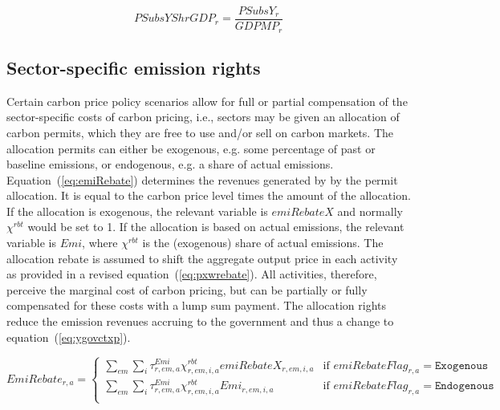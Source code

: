 \documentclass[11pt,letterpaper]{report}
\begin{document}
\begin{equation}
\label{eq:pSubsYShrGDP}
\mathit{PSubsYShrGDP}_r = \frac{\mathit{PSubsY}_r}{\mathit{GDPMP}_r}
\end{equation}

\subsection{Sector-specific emission rights}

Certain carbon price policy scenarios allow for full or partial
compensation of the sector-specific costs of carbon pricing, i.e.,
sectors may be given an allocation of carbon permits, which
they are free to use and/or sell on carbon markets. The allocation
permits can either be exogenous, e.g. some percentage of past
or baseline emissions, or endogenous, e.g. a share of actual
emissions. Equation~(\ref{eq:emiRebate}) determines the revenues generated by
by the permit allocation. It is equal to the carbon price level
times the amount of the allocation. If the allocation
is exogenous, the relevant variable is $\mathit{emiRebateX}$ and normally
$\chi^{\mathit{rbt}}$ would be set to 1. If the allocation is based on
actual emissions, the relevant variable is $\mathit{Emi}$, where
$\chi^{\mathit{rbt}}$ is the (exogenous) share of actual emissions.
The allocation rebate is assumed to shift the aggregate output price
in each activity as provided in a revised equation~(\ref{eq:pxwrebate}).
All activities, therefore, perceive the marginal cost of carbon
pricing, but can be partially or fully compensated for these costs
with a lump sum payment. The allocation rights reduce the emission revenues
accruing to the government and thus a change to equation~(\ref{eq:ygovctxp}).

\begin{equation}
\label{eq:emiRebate}
\mathit{EmiRebate}_{r,a} =
\begin{cases} \displaystyle
\sum_{\mathit{em}}{\sum_i{\tau^{\mathit{Emi}}_{r,\mathit{em},\mathit{a}}  \chi^{\mathit{rbt}}_{r,\mathit{em},i,a} \mathit{emiRebateX}_{r,\mathit{em},i,a}}} & \textrm{if } \mathit{emiRebateFlag}_{r,a} = \texttt{Exogenous} \\
\displaystyle
\sum_{\mathit{em}}{\sum_i{\tau^{\mathit{Emi}}_{r,\mathit{em},\mathit{a}}  \chi^{\mathit{rbt}}_{r,\mathit{em},i,a} \mathit{Emi}_{r,\mathit{em},i,a}}} & \textrm{if } \mathit{emiRebateFlag}_{r,a} = \texttt{Endogenous} \\
\end{cases}
\end{equation}
\end{document}
